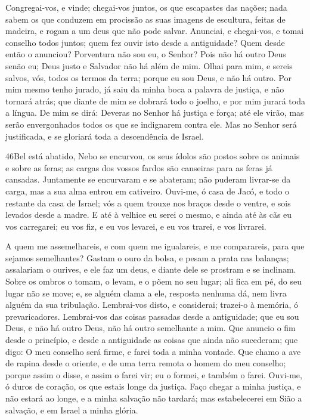 Congregai-vos, e vinde; chegai-vos juntos, os que escapastes das
nações; nada sabem os que conduzem em procissão as suas imagens de
escultura, feitas de madeira, e rogam a um deus que não pode salvar.
Anunciai, e chegai-vos, e tomai conselho todos juntos; quem
fez ouvir isto desde a antiguidade? Quem desde então o anunciou?
Porventura não sou eu, o Senhor? Pois não há outro Deus senão eu;
Deus justo e Salvador não há além de mim. Olhai para mim, e
sereis salvos, vós, todos os termos da terra; porque eu sou Deus, e
não há outro. Por mim mesmo tenho jurado, já saiu da minha
boca a palavra de justiça, e não tornará atrás; que diante de mim se
dobrará todo o joelho, e por mim jurará toda a língua. De mim
se dirá: Deveras no Senhor há justiça e força; até ele virão, mas
serão envergonhados todos os que se indignarem contra ele.
Mas no Senhor será justificada, e se gloriará toda a
descendência de Israel.

\medskip

\lettrine{46}{}Bel está abatido, Nebo se encurvou, os seus
ídolos são postos sobre os animais e sobre as feras; as cargas dos
vossos fardos são canseiras para as feras já cansadas.
Juntamente se encurvaram e se abateram; não puderam livrar-se da
carga, mas a sua alma entrou em cativeiro. Ouvi-me, ó casa de
Jacó, e todo o restante da casa de Israel; vós a quem trouxe nos
braços desde o ventre, e sois levados desde a madre. E até à
velhice eu serei o mesmo, e ainda até às cãs eu vos carregarei; eu
vos fiz, e eu vos levarei, e eu vos trarei, e vos livrarei.

A quem me assemelhareis, e com quem me igualareis, e me
comparareis, para que sejamos semelhantes? Gastam o ouro da
bolsa, e pesam a prata nas balanças; assalariam o ourives, e ele faz
um deus, e diante dele se prostram e se inclinam. Sobre os
ombros o tomam, o levam, e o põem no seu lugar; ali fica em pé, do
seu lugar não se move; e, se alguém clama a ele, resposta nenhuma
dá, nem livra alguém da sua tribulação. Lembrai-vos disto, e
considerai; trazei-o à memória, ó prevaricadores. Lembrai-vos
das coisas passadas desde a antiguidade; que eu sou Deus, e não há
outro Deus, não há outro semelhante a mim. Que anuncio o fim
desde o princípio, e desde a antiguidade as coisas que ainda não
sucederam; que digo: O meu conselho será firme, e farei toda a minha
vontade. Que chamo a ave de rapina desde o oriente, e de uma
terra remota o homem do meu conselho; porque assim o disse, e assim
o farei vir; eu o formei, e também o farei. Ouvi-me, ó duros
de coração, os que estais longe da justiça. Faço chegar a
minha justiça, e não estará ao longe, e a minha salvação não
tardará; mas estabelecerei em Sião a salvação, e em Israel a minha
glória.

